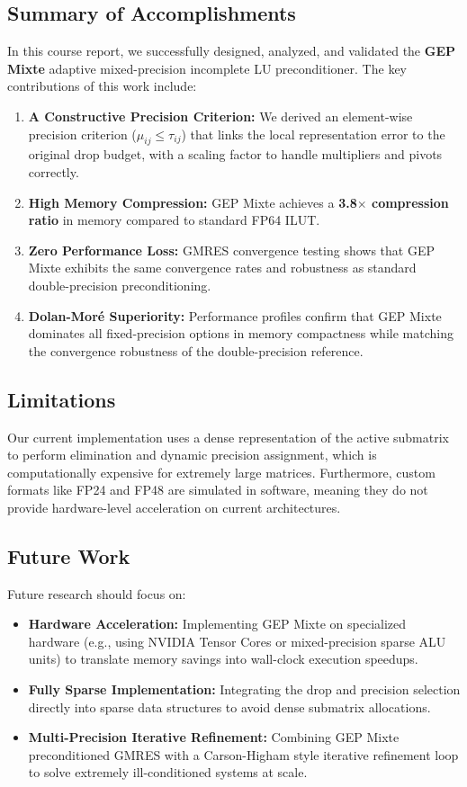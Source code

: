 \documentclass[11pt,a4paper]{article}
\begin{document}
\subsection{Summary of Accomplishments}
In this course report, we successfully designed, analyzed, and validated the \textbf{GEP Mixte} adaptive mixed-precision incomplete LU preconditioner. The key contributions of this work include:
\begin{enumerate}
    \item \textbf{A Constructive Precision Criterion:} We derived an element-wise precision criterion ($\mu_{ij} \le \tau_{ij}$) that links the local representation error to the original drop budget, with a scaling factor to handle multipliers and pivots correctly.
    \item \textbf{High Memory Compression:} GEP Mixte achieves a \textbf{3.8$\times$ compression ratio} in memory compared to standard FP64 ILUT.
    \item \textbf{Zero Performance Loss:} GMRES convergence testing shows that GEP Mixte exhibits the same convergence rates and robustness as standard double-precision preconditioning.
    \item \textbf{Dolan-Moré Superiority:} Performance profiles confirm that GEP Mixte dominates all fixed-precision options in memory compactness while matching the convergence robustness of the double-precision reference.
\end{enumerate}

\subsection{Limitations}
Our current implementation uses a dense representation of the active submatrix to perform elimination and dynamic precision assignment, which is computationally expensive for extremely large matrices. Furthermore, custom formats like FP24 and FP48 are simulated in software, meaning they do not provide hardware-level acceleration on current architectures.

\subsection{Future Work}
Future research should focus on:
\begin{itemize}
    \item \textbf{Hardware Acceleration:} Implementing GEP Mixte on specialized hardware (e.g., using NVIDIA Tensor Cores or mixed-precision sparse ALU units) to translate memory savings into wall-clock execution speedups.
    \item \textbf{Fully Sparse Implementation:} Integrating the drop and precision selection directly into sparse data structures to avoid dense submatrix allocations.
    \item \textbf{Multi-Precision Iterative Refinement:} Combining GEP Mixte preconditioned GMRES with a Carson-Higham style iterative refinement loop to solve extremely ill-conditioned systems at scale.
\end{itemize}
\end{document}
